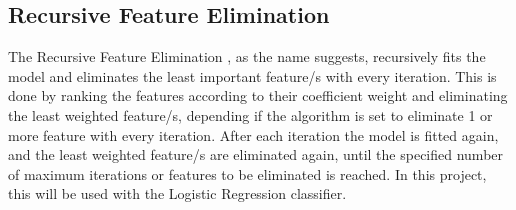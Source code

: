 \subsection{Recursive Feature Elimination}\label{ssec:rfe}
The Recursive Feature Elimination \cite{guyon2002gene}, as the name suggests, recursively fits the model and eliminates the least important feature/s with every iteration. This is done by ranking the features according to their coefficient weight and eliminating the least weighted feature/s, depending if the algorithm is set to eliminate 1 or more feature with every iteration. After each iteration the model is fitted again, and the least weighted feature/s are eliminated again, until the specified number of maximum iterations or features to be eliminated is reached. In this project, this will be used with the Logistic Regression classifier.                                                                    
